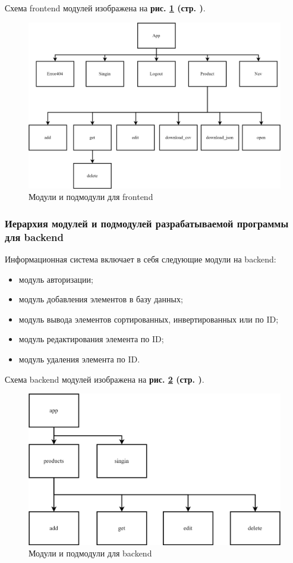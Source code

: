 Схема frontend модулей изображена на
\textbf{рис. \ref{fig:gpi_frontend_modules} (стр. \pageref{fig:gpi_frontend_modules})}.

\begin{figure}[!htp]
    \centering
    \includegraphics[width=12.5cm]
        {_assets/gpi_frontend_modules.png}
    \caption{Модули и подмодули для frontend}
    \label{fig:gpi_frontend_modules}
\end{figure}

\newpage

\subsubsection*{Иерархия модулей и подмодулей разрабатываемой программы для backend}

Информационная система включает в себя следующие модули на backend:

\begin{itemize}
    \item модуль авторизации;
    \item модуль добавления элементов в базу данных;
    \item модуль вывода элементов сортированных, инвертированных или по ID;
    \item модуль редактирования элемента по ID;
    \item модуль удаления элемента по ID.
\end{itemize}

Схема backend модулей изображена на
\textbf{рис. \ref{fig:gpi_backend_modules} (стр. \pageref{fig:gpi_backend_modules})}.

\begin{figure}[!htp]
    \centering
    \includegraphics[width=16cm]
        {_assets/gpi_backend_modules.png}
    \caption{Модули и подмодули для backend}
    \label{fig:gpi_backend_modules}
\end{figure}

\newpage
